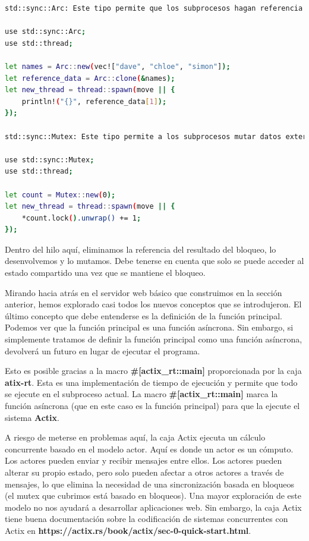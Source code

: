 \begin{lstlisting}[language=bash]
std::sync::Arc: Este tipo permite que los subprocesos hagan referencia a datos externos:

use std::sync::Arc;
use std::thread;

let names = Arc::new(vec!["dave", "chloe", "simon"]);
let reference_data = Arc::clone(&names);
let new_thread = thread::spawn(move || {
	println!("{}", reference_data[1]);
});

std::sync::Mutex: Este tipo permite a los subprocesos mutar datos externos:

use std::sync::Mutex;
use std::thread;

let count = Mutex::new(0);
let new_thread = thread::spawn(move || {
	*count.lock().unwrap() += 1;	
});
\end{lstlisting}

Dentro del hilo aquí, eliminamos la referencia del resultado del bloqueo, lo desenvolvemos y lo mutamos. Debe tenerse en cuenta que solo se puede acceder al estado compartido una vez que se mantiene el bloqueo.

Mirando hacia atrás en el servidor web básico que construimos en la sección anterior, hemos explorado casi todos los nuevos conceptos que se introdujeron. El último concepto que debe entenderse es la definición de la función principal. Podemos ver que la función principal es una función asíncrona. Sin embargo, si simplemente tratamos de definir la función principal como una función asíncrona, devolverá un futuro en lugar de ejecutar el programa.

Esto es posible gracias a la macro \textbf{\#[actix\_rt::main]} proporcionada por la caja \textbf{atix-rt}. Esta es una implementación de tiempo de ejecución y permite que todo se ejecute en el subproceso actual. La macro \textbf{\#[actix\_rt::main]} marca la función asíncrona (que en este caso es la función principal) para que la ejecute el sistema \textbf{Actix}.

A riesgo de meterse en problemas aquí, la caja Actix ejecuta un cálculo concurrente basado en el modelo actor. Aquí es donde un actor es un cómputo. Los actores pueden enviar y recibir mensajes entre ellos. Los actores pueden alterar su propio estado, pero solo pueden afectar a otros actores a través de mensajes, lo que elimina la necesidad de una sincronización basada en bloqueos (el mutex que cubrimos está basado en bloqueos). Una mayor exploración de este modelo no nos ayudará a desarrollar aplicaciones web. Sin embargo, la caja Actix tiene buena documentación sobre la codificación de sistemas concurrentes con Actix en \textbf{https://actix.rs/book/actix/sec-0-quick-start.html}.

